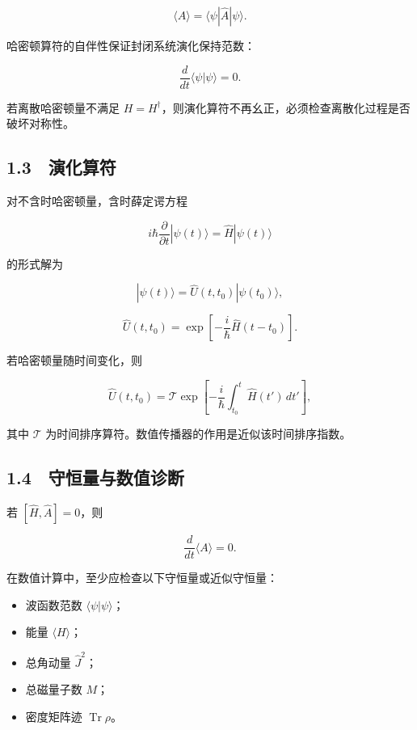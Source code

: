 \documentclass[
  a4paper,
]{ctexbook}
\providecommand{\tightlist}{%
  \setlength{\itemsep}{0pt}\setlength{\parskip}{0pt}}
\begin{document}
\[
\langle A\rangle
=
\langle\psi|\hat A|\psi\rangle.
\]

哈密顿算符的自伴性保证封闭系统演化保持范数：

\[
\frac{d}{dt}\langle\psi|\psi\rangle=0.
\]

若离散哈密顿量不满足
\(H=H^{\dagger}\)，则演化算符不再幺正，必须检查离散化过程是否破坏对称性。

\hypertarget{ux6f14ux5316ux7b97ux7b26}{%
\subsection{1.3　演化算符}\label{ux6f14ux5316ux7b97ux7b26}}

对不含时哈密顿量，含时薛定谔方程

\[
i\hbar\frac{\partial}{\partial t}|\psi(t)\rangle
=
\hat H|\psi(t)\rangle
\]

的形式解为

\[
|\psi(t)\rangle
=
\hat U(t,t_0)|\psi(t_0)\rangle,
\]

\[
\hat U(t,t_0)
=
\exp\left[-\frac{i}{\hbar}\hat H(t-t_0)\right].
\]

若哈密顿量随时间变化，则

\[
\hat U(t,t_0)
=
\mathcal{T}
\exp\left[
-\frac{i}{\hbar}
\int_{t_0}^{t}\hat H(t')\,dt'
\right],
\]

其中 \(\mathcal{T}\)
为时间排序算符。数值传播器的作用是近似该时间排序指数。

\hypertarget{ux5b88ux6052ux91cfux4e0eux6570ux503cux8bcaux65ad}{%
\subsection{1.4　守恒量与数值诊断}\label{ux5b88ux6052ux91cfux4e0eux6570ux503cux8bcaux65ad}}

若 \([\hat H,\hat A]=0\)，则

\[
\frac{d}{dt}\langle A\rangle=0.
\]

在数值计算中，至少应检查以下守恒量或近似守恒量：

\begin{itemize}
\tightlist
\item
  波函数范数 \(\langle\psi|\psi\rangle\)；
\item
  能量 \(\langle H\rangle\)；
\item
  总角动量 \(\hat J^2\)；
\item
  总磁量子数 \(M\)；
\item
  密度矩阵迹 \(\operatorname{Tr}\rho\)。
\end{itemize}
\end{document}
